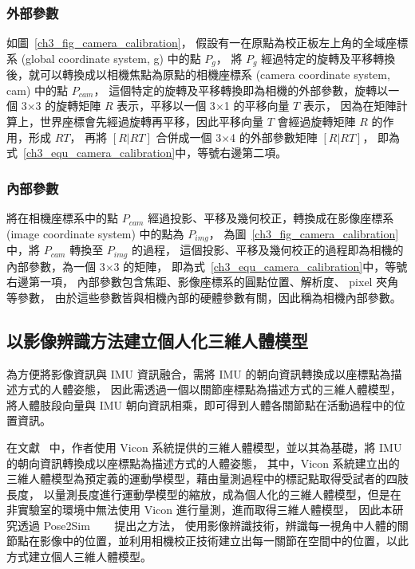 \subsubsection*{外部參數}
如圖~\ref{ch3_fig_camera_calibration}，
假設有一在原點為校正板左上角的全域座標系 (global coordinate system, g) 中的點 $P_g$，
將 $P_g$ 經過特定的旋轉及平移轉換後，就可以轉換成以相機焦點為原點的相機座標系 (camera coordinate system, cam) 中的點 $P_{cam}$，
這個特定的旋轉及平移轉換即為相機的外部參數，旋轉以一個 3$\times$3 的旋轉矩陣 $R$ 表示，平移以一個 3$\times$1 的平移向量 $T$ 表示，
因為在矩陣計算上，世界座標會先經過旋轉再平移，因此平移向量 $T$ 會經過旋轉矩陣 $R$ 的作用，形成 $RT$，
再將 $[R|RT]$ 合併成一個 3$\times$4 的外部參數矩陣 $[R|RT]$，
即為式~\ref{ch3_equ_camera_calibration}中，等號右邊第二項。

\subsubsection*{內部參數}
將在相機座標系中的點 $P_{cam}$ 經過投影、平移及幾何校正，轉換成在影像座標系 (image coordinate system) 中的點為 $P_{img}$，
為圖~\ref{ch3_fig_camera_calibration}中，將 $P_{cam}$ 轉換至 $P_{img}$ 的過程，
這個投影、平移及幾何校正的過程即為相機的內部參數，為一個 3$\times$3 的矩陣，
即為式~\ref{ch3_equ_camera_calibration}中，等號右邊第一項，
內部參數包含焦距、影像座標系的圓點位置、解析度、 pixel 夾角等參數，
由於這些參數皆與相機內部的硬體參數有關，因此稱為相機內部參數。

\subsection{以影像辨識方法建立個人化三維人體模型}\label{ch3_skeleton_method}
為方便將影像資訊與 IMU 資訊融合，需將 IMU 的朝向資訊轉換成以座標點為描述方式的人體姿態，
因此需透過一個以關節座標點為描述方式的三維人體模型，將人體肢段向量與 IMU 朝向資訊相乘，即可得到人體各關節點在活動過程中的位置資訊。

在文獻~\cite{Zhang_2020_CVPR} 中，作者使用 Vicon 系統提供的三維人體模型，並以其為基礎，將 IMU 的朝向資訊轉換成以座標點為描述方式的人體姿態，
其中，Vicon 系統建立出的三維人體模型為預定義的運動學模型，藉由量測過程中的標記點取得受試者的四肢長度，
以量測長度進行運動學模型的縮放，成為個人化的三維人體模型，但是在非實驗室的環境中無法使用 Vicon 進行量測，進而取得三維人體模型，
因此本研究透過 Pose2Sim ~\cite{Pagnon_2022_JOSS}~\cite{Pagnon_2021_Robustness}~\cite{Pagnon_2022_Accuracy} 提出之方法，
使用影像辨識技術，辨識每一視角中人體的關節點在影像中的位置，並利用相機校正技術建立出每一關節在空間中的位置，以此方式建立個人三維人體模型。

